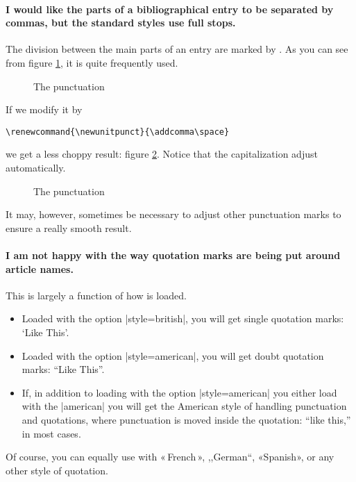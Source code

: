 \paragraph{I would like the parts of a bibliographical entry to be separated by commas, but the standard styles use full stops.} The division between the main parts of an entry are marked by . As you can see from figure \ref{punctcite10}, it is quite frequently used.
\begin{figure}
\caption{The  punctuation\label{punctcite10}}
\end{figure}

If we modify it by
\begin{Verbatim}
\renewcommand{\newunitpunct}{\addcomma\space}
\end{Verbatim}
we get a less choppy result: figure \ref{punctcite11}. Notice that the capitalization adjust automatically.\begin{figure}
\caption{The  punctuation\label{punctcite11}}
\end{figure} It may, however, sometimes be necessary to adjust other punctuation marks to ensure a really smooth result.

 \paragraph{I am not happy with the way quotation marks are being put around article names.} This is largely a function of how  is loaded.
 \begin{itemize}
 \item Loaded with the option |style=british|, you will get single quotation marks: `Like This'.
 \item Loaded with the option |style=american|, you will get doubt quotation marks: ``Like This''.
 \item If, in addition to loading  with the option |style=american| you either load  with the |american| you will get the American style of handling punctuation and quotations, where punctuation is moved inside the quotation: ``like this,'' in most cases.
 \end{itemize}
Of course, you can equally use  with «\,French\,», ,,German``, «Spanish», or any other style of quotation.

\newcommand{\sublimetextsux}[2]{}\sublimetextsux''

